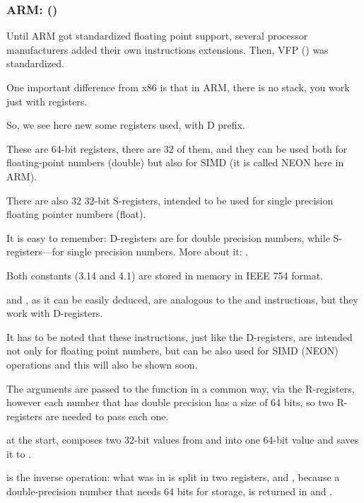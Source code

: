 \subsubsection{ARM: \OptimizingXcodeIV (\ARMMode)}

Until ARM got standardized floating point support, several processor manufacturers added their own 
instructions extensions.
Then,  VFP () was standardized.

One important difference from x86 is that in ARM, there
is no stack, you work just with registers.




So, we see here new some registers used, with D prefix.

These are 64-bit registers, there are 32 of them, and they can be used both for floating-point numbers 
(double) but also for SIMD (it is called NEON here in ARM).

There are also 32 32-bit S-registers, intended to be used for single precision 
floating pointer numbers (float).

It is easy to remember: D-registers are for double precision numbers, while
S-registers---for single precision numbers.
More about it: .

Both constants (3.14 and 4.1) are stored in memory in IEEE 754 format.

 and , as it can be easily deduced, are analogous to the  and \MOV instructions,
but they work with D-registers.

It has to be noted that these instructions, just like the D-registers, are intended not only for
floating point numbers, 
but can be also used for SIMD (NEON) operations and this will also be shown soon.

The arguments are passed to the function in a common way, via the R-registers, however
each number that has double precision has a size of 64 bits, so two R-registers are needed to pass each one.

 at the start, composes two 32-bit values from  and  into one 64-bit value
and saves it to .

 is the inverse operation: what was in  
is split in two registers,  and , because a double-precision number 
that needs 64 bits for storage, is returned in  and .

